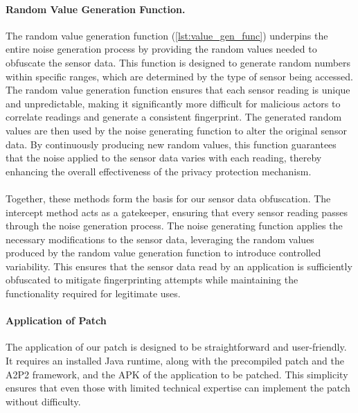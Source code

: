 \documentclass[11pt,
  oneside,openany,    %
]{scrreprt}
\begin{document}
\paragraph{Random Value Generation Function.}
\label{par:random_vale_gen_func}
The random value generation function (\ref{lst:value_gen_func}) underpins the entire noise generation process by providing the random values needed to obfuscate the sensor data.
This function is designed to generate random numbers within specific ranges, which are determined by the type of sensor being accessed.
The random value generation function ensures that each sensor reading is unique and unpredictable, making it significantly more difficult for malicious actors to correlate readings and generate a consistent fingerprint.
The generated random values are then used by the noise generating function to alter the original sensor data.
By continuously producing new random values, this function guarantees that the noise applied to the sensor data varies with each reading, thereby enhancing the overall effectiveness of the privacy protection mechanism.

\paragraph{}
Together, these methods form the basis for our sensor data obfuscation. 
The intercept method acts as a gatekeeper, ensuring that every sensor reading passes through the noise generation process.
The noise generating function applies the necessary modifications to the sensor data, leveraging the random values produced by the random value generation function to introduce controlled variability.
This ensures that the sensor data read by an application is sufficiently obfuscated to mitigate fingerprinting attempts while maintaining the functionality required for legitimate uses.

\paragraph{Application of Patch}
\label{par:applying}
The application of our patch is designed to be straightforward and user-friendly.
It requires an installed Java runtime, along with the precompiled patch and the A2P2 framework, and the APK of the application to be patched.
This simplicity ensures that even those with limited technical expertise can implement the patch without difficulty.
\end{document}

